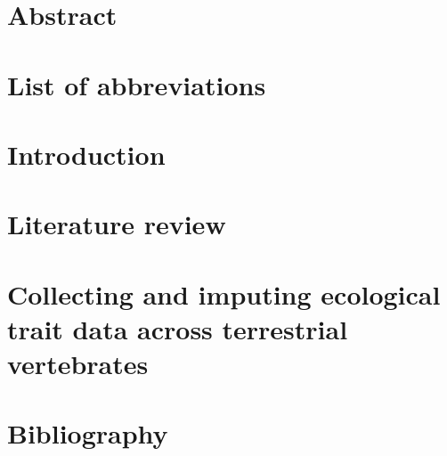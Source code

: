 \documentclass[11pt]{report}
\begin{document}




\chapter*{Abstract}


\clearpage
\tableofcontents


\clearpage
\listoftables

\listoffigures



\chapter*{List of abbreviations}


\clearpage
\chapter{Introduction}
%

\chapter{Literature review}
%

\pagebreak
\chapter{Collecting and imputing ecological trait data across terrestrial vertebrates}


%

%


\clearpage
\chapter*{Bibliography}
\printbibliography[heading=none]
\end{document}
